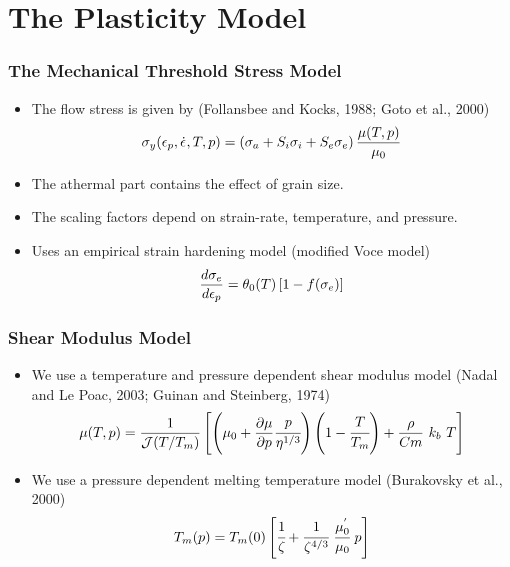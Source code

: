\documentclass{beamer}
\begin{document}
  \section{The Plasticity Model}
    \begin{frame}
      \frametitle{The Mechanical Threshold Stress Model}
      \begin{itemize}[<+-| alert@+>]
        \item The flow stress is given by 
        {\tiny (Follansbee and Kocks, 1988; Goto et al., 2000)}
        \begin{equation} \label{eq:MTSSigmay}
           \sigma_y(\epsilon_p,\dot{\epsilon}_{},T,p) =
             \left(\sigma_a + S_i \sigma_i + S_e \sigma_e\right)
             \frac{\mu(T,p)}{\mu_0}
        \end{equation}
        \item The athermal part contains the effect of grain size.
        \item The scaling factors depend on strain-rate, temperature,
           and pressure.
        \item Uses an empirical strain hardening model (modified Voce model)
          \begin{equation}
            \frac{d\sigma_e}{d\epsilon_p} = \theta_0(T) \left[ 1 - f(\sigma_e)\right]
          \end{equation}
      \end{itemize}
    \end{frame}

    \begin{frame}
    \frametitle{Shear Modulus Model}
    \begin{itemize}[<+-| alert@+>]
      \item We use a temperature and pressure dependent shear modulus model
      {\tiny (Nadal and Le Poac, 2003; Guinan and Steinberg, 1974)}
      \begin{equation} \label{eq:NPShear}
        \mu(T,p) = \frac{1}{\mathcal{J}(T/T_m)}
        \left[
          \left(\mu_0 + \frac{\partial \mu}{\partial p} \cfrac{p}{\eta^{1/3}} \right)
          \left(1 - \cfrac{T}{T_m}\right) + \frac{\rho}{Cm}~k_b~T\right]
      \end{equation}
      \item We use a pressure dependent melting temperature model
      {\tiny (Burakovsky et al., 2000)}
      \begin{equation}
        T_m(p) = T_m(0)
          \left[\cfrac{1}{\zeta} +
                \cfrac{1}{\zeta^{4/3}}~\cfrac{\mu_0^{'}}{\mu_0}~p\right]
      \end{equation}
    \end{itemize}
    \end{frame}
\end{document}
